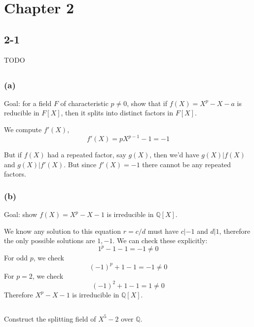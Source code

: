\documentclass{article}
\begin{document}
\section{Chapter 2}

\subsection{2-1}
TODO

\subsection{}

\subsubsection{(a)}
Goal: for a field \(F\) of characteristic \(p\neq 0\), show that if $ f(X) = X^{p} - X - a $ is reducible in $F\left[X\right]$, then it splits into distinct factors in $F\left[X\right]$.

We compute \(f'(X)\),
\begin{equation}
f'(X) = pX^{p-1} - 1 = -1
\end{equation}

But if \(f(X)\) had a repeated factor, say \(g(X)\), then we'd have \(g(X) | f(X)\) and \(g(X) | f'(X)\). But since \(f'(X)=-1\) there cannot be any repeated factors.

\subsubsection{(b)}
Goal: show $ f(X) = X^{p} - X - 1 $ is irreducible in \(\mathbb{Q}\left[X\right]\).

We know any solution to this equation $r=c/d$ must have \(c|-1\) and \(d|1\), therefore the only possible solutions are \(1, -1\). We can check these explicitly:
\begin{equation}
1^{p} - 1 - 1 = -1 \neq 0
\end{equation}
For odd \(p\), we check
\begin{equation}
(-1)^{p} + 1 - 1 = -1 \neq 0
\end{equation}
For \(p=2\), we check
\begin{equation}
(-1)^{2} + 1 - 1 = 1 \neq 0
\end{equation}
Therefore \(X^{p}-X-1\) is irreducible in \(\mathbb{Q}\left[X\right]\).

\subsection{}
Construct the splitting field of \(X^{5}-2\) over \(\mathbb{Q}\).
\end{document}
